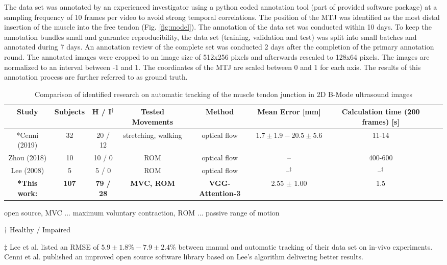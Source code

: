 \documentclass[letterpaper, 10 pt, conference]{ieeeconf}
\begin{document}
The data set was annotated by an experienced investigator using a python coded annotation tool (part of provided software package) at a sampling frequency of 10 frames per video to avoid strong temporal correlations. The position of the MTJ was identified as the most distal insertion of the muscle into the free tendon (Fig. \ref{fig:model}). The annotation of the data set was conducted within 10 days. To keep the annotation bundles small and guarantee reproducibility, the data set (training, validation and test) was split into small batches and annotated during 7 days. An annotation review of the complete set was conducted 2 days after the completion of the primary annotation round. The annotated images were cropped to an image size of 512x256 pixels and afterwards rescaled to 128x64 pixels. The images are normalized to an interval between -1 and 1. The coordinates of the MTJ are scaled between 0 and 1 for each axis. The results of this annotation process are further referred to as ground truth.
\begin{table*}[thpb]
\caption{Comparison of identified research on automatic tracking of the muscle tendon junction in 2D B-Mode ultrasound images}
\centering
\label{tab:algorithms}
\begin{center}
\setlength{\tabcolsep}{3pt} \renewcommand{\arraystretch}{1.5}
\begin{tabular}{cccccccc}
\toprule
\textbf{Study}  & \textbf{Subjects} & \textbf{H / I$^\dagger$}   & \textbf{Tested Movements}  & \textbf{Method}  &\textbf{Mean Error [mm]}    &\textbf{Calculation time (200 frames)  [s] }\\ 
\midrule
*Cenni (2019) \cite{j:Cenni2019} &32 & 20 / 12   &stretching, walking    &optical flow &$1.7\pm1.9 - 20.5\pm5.6$  &11-14\\
Zhou (2018) \cite{j:Zhou2018}   &10   &10 / 0   &ROM  &optical flow  &--    &400-600\\ 
Lee (2008) \cite{j:Lee2008} &5 &5 / 0 &ROM &optical flow  &--$^\ddagger$    &--$^\ddagger$  \\  
\textbf{*This work:} & \textbf{107}   & \textbf{79 / 28}  &\textbf{MVC, ROM}  &\textbf{VGG-Attention-3} &2.55 $\pm$ 1.00 &1.5\\
\bottomrule
\end{tabular}
 \begin{tablenotes}
    \item * open source, MVC ... maximum voluntary contraction, ROM ... passive range of motion
    \item $\dagger$ Healthy / Impaired
    \item $\ddagger$ Lee et al. \cite{j:Lee2008} listed an RMSE of $5.9\pm1.8\%-7.9\pm2.4\%$ between manual and automatic tracking of their data set on in-vivo experiments. Cenni et al. \cite{j:Cenni2019} published an improved open source software library based on Lee's algorithm delivering better results.
    \end{tablenotes}
\end{center}
\end{table*}
\end{document}
